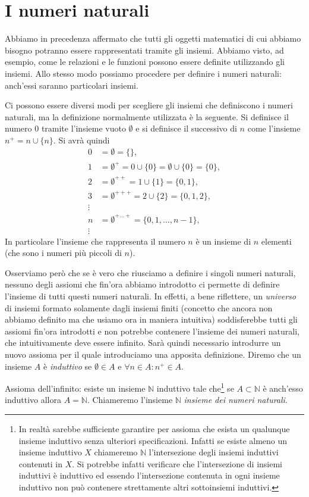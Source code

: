 \documentclass[italian,a4paper,hidelinks,headinclude]{scrartcl}
\newcommand{\NN}{{\mathbb N}}
\newcommand{\myemph}[1]{\emph{#1}\marginpar{#1}}
\begin{document}
\section{I numeri naturali}

Abbiamo in precedenza affermato che tutti gli oggetti matematici di cui abbiamo
bisogno potranno essere rappresentati tramite gli insiemi.
Abbiamo visto, ad esempio, come le relazioni e le funzioni possono essere definite
utilizzando gli insiemi. Allo stesso modo possiamo procedere per definire i numeri
naturali: anch'essi saranno particolari insiemi.

Ci possono essere diversi modi per scegliere gli insiemi che definiscono i numeri
naturali, ma la definizione normalmente utilizzata è la seguente.
Si definisce il numero $0$ tramite l'insieme vuoto $\emptyset$ e si definisce
il successivo di $n$ come l'insieme $n^+ = n \cup \{ n \}$. Si avrà quindi
\begin{align*}
  0 &= \emptyset = \{\}, \\
  1 &= \emptyset^+ = 0 \cup \{0\} = \emptyset \cup \{0\} = \{0\}, \\
  2 &= \emptyset^{++} = 1 \cup \{1\} = \{0, 1\}, \\
  3 &= \emptyset^{+++} = 2 \cup \{2\} = \{0, 1, 2\},\\
  \vdots \\
  n &= \emptyset^{+\dots +} = \{ 0, 1, \dots, n-1\}, \\
  \vdots
\end{align*}
In particolare l'insieme che rappresenta il numero $n$ è un insieme di $n$
elementi (che sono i numeri più piccoli di $n$).

Osserviamo però che se è vero che riusciamo a definire i singoli numeri naturali,
nessuno degli assiomi che fin'ora abbiamo introdotto ci permette di definire
l'insieme di tutti questi numeri naturali.
In effetti, a bene riflettere, un \emph{universo} di insiemi formato solamente
dagli insiemi finiti (concetto che ancora non abbiamo definito ma che usiamo ora
in maniera intuitiva) soddisferebbe tutti gli assiomi fin'ora introdotti e non
potrebbe contenere l'insieme dei numeri naturali, che intuitivamente deve essere
infinito.
Sarà quindi necessario introdurre un nuovo assioma per il quale
introduciamo una apposita definizione.
Diremo che un insieme $A$ è \emph{induttivo} se $\emptyset \in A$
e $\forall n\in A\colon n^+\in A$.

Assioma dell'infinito:
esiste un insieme $\NN$ \marginpar{$\NN$}
induttivo
tale che\footnote{%
In realtà sarebbe sufficiente garantire per assioma che esista un qualunque insieme induttivo
senza ulteriori specificazioni. Infatti se esiste almeno un insieme induttivo
$X$ chiameremo $\mathbb N$
l'intersezione degli insiemi induttivi contenuti in $X$. Si potrebbe infatti
verificare che l'intersezione di insiemi induttivi è induttivo ed essendo
l'intersezione contenuta in ogni insieme induttivo non può contenere strettamente
altri sottoinsiemi induttivi.
}
se $A\subset \NN$ è anch'esso induttivo allora $A=\NN$.
Chiameremo l'insieme $\NN$
\myemph{insieme dei numeri naturali}.
\end{document}

